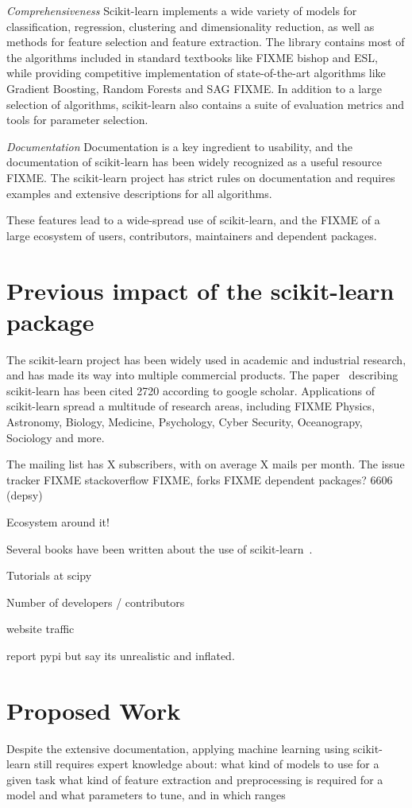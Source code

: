 \emph{Comprehensiveness} Scikit-learn implements a wide variety of models for classification,
regression, clustering and dimensionality reduction, as well as methods for feature
selection and feature extraction. The library contains most of the algorithms included
in standard textbooks like FIXME bishop and ESL, while providing competitive implementation
of state-of-the-art algorithms like Gradient Boosting, Random Forests and SAG FIXME\@.
In addition to a large selection of algorithms, scikit-learn also contains a suite
of evaluation metrics and tools for parameter selection.

\emph{Documentation}
Documentation is a key ingredient to usability, and the documentation of scikit-learn
has been widely recognized as a useful resource FIXME\@. The scikit-learn project
has strict rules on documentation and requires examples and extensive descriptions
for all algorithms.

These features lead to a wide-spread use of scikit-learn, and the FIXME of a large
ecosystem of users, contributors, maintainers and dependent packages.

\section{Previous impact of the scikit-learn package}
The scikit-learn project has been widely used in academic and industrial research,
and has made its way into multiple commercial products. The
paper~\cite{pedregosa2011scikit} describing scikit-learn has been cited 2720
according to google scholar. Applications of scikit-learn spread
a multitude of research areas, including FIXME Physics, Astronomy,
Biology, Medicine, Psychology, Cyber Security, Oceanograpy, Sociology and more.

The mailing list has X subscribers, with on average X mails per month.
The issue tracker FIXME stackoverflow FIXME, forks FIXME
dependent packages? 6606 (depsy)

Ecosystem around it!

Several books have been written about the use of scikit-learn~\cite{garreta2013learning, hackeling2014mastering, hauck2014scikit, raschka2015python}.

Tutorials at scipy

Number of developers / contributors

website traffic

report pypi but say its unrealistic and inflated.

\section{Proposed Work}
Despite the extensive documentation, applying machine learning using scikit-learn
still requires expert knowledge about:
what kind of models to use for a given task
what kind of feature extraction and preprocessing is required for a model
and what parameters to tune, and in which ranges

